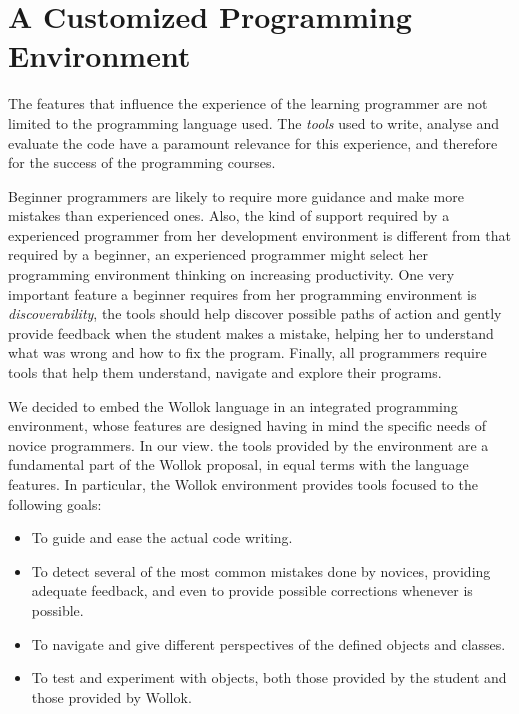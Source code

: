 \section{A Customized Programming Environment}
\label{sec:environment}


The features that influence the experience of the learning programmer are not limited to the programming language used. 
The \emph{tools} used to write, analyse and evaluate the code have a paramount relevance for this experience, and therefore for the success of the programming courses.

Beginner programmers are likely to require more guidance and make more mistakes than experienced ones.
Also, the kind of support required by a experienced programmer from her development environment is different from that required by a beginner, \eg an experienced programmer might select her programming environment thinking on increasing productivity.
One very important feature a beginner requires from her programming environment is \emph{discoverability}, \ie the tools should help discover possible paths of action and gently provide feedback when the student makes a mistake, helping her to understand what was wrong and how to fix the program.
Finally, all programmers require tools that help them understand, navigate and explore their programs.

We decided to embed the Wollok language in an integrated programming environment, whose features are designed having in mind the specific needs of novice programmers.
In our view. the tools provided by the environment are a fundamental part of the Wollok proposal, in equal terms with the language features.
In particular, the Wollok environment provides tools focused to the following goals:
\begin{itemize}
\vspace*{-1mm}
\item To guide and ease the actual code writing.
\vspace*{-1mm}
\item To detect several of the most common mistakes done by novices, providing adequate feedback, and even to provide possible corrections whenever is possible.
\vspace*{-1mm}
\item To navigate and give different perspectives of the defined objects and classes.
\vspace*{-1mm}
\item To test and experiment with objects, both those provided by the student and those provided by Wollok.
\end{itemize}

